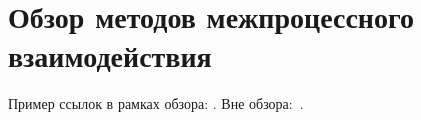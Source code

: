 \chapter{Обзор методов межпроцессного взаимодействия}

\startrelatedwork
Пример ссылок в рамках обзора: \cite{example-english, example-russian, unrestricted-jump-evco, nsga-ii-steady-state}.
\finishrelatedwork
Вне обзора:~\cite{bellman}.
%
%
%
%
%
